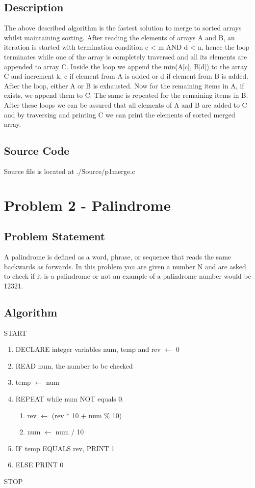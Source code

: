 \documentclass{article}
\begin{document}
\subsection{Description}
The above described algorithm is the fastest solution to merge to sorted arrays whilst maintaining sorting. After reading the elements of arrays A and B, an iteration is started with termination condition c < m AND d < n, hence the loop terminates while one of the array is completely traversed and all its elements are appended to array C. Inside the loop we append the min(A[c], B[d]) to the array C and increment k, c if element from A is added or d if element from B is added.\newline
After the loop, either A or B is exhausted. Now for the remaining items in A, if exists, we append them to C. The same is repeated for the remaining items in B.\newline
After these loops we can be assured that all elements of A and B are added to C and by traversing and printing C we can print the elements of sorted merged array.

\subsection{Source Code}
Source file is located at ./Source/p1merge.c

\newpage
\section{Problem 2 - Palindrome}
\subsection{Problem Statement}
A palindrome is defined as a word, phrase, or sequence that reads the same backwards as forwards. In this problem you are given a number N and are asked to check if it is a palindrome or not an example of a palindrome number would be 12321.
\subsection{Algorithm}
START
\begin{flushleft}
\begin{enumerate}
    \item DECLARE integer variables num, temp and rev $\leftarrow$ 0
    \item READ num, the number to be checked
    \item temp $\leftarrow$ num
    \item REPEAT while num NOT equals 0.
    \begin{enumerate}
        \item rev $\leftarrow$ (rev * 10 + num \% 10)
        \item num $\leftarrow$ num / 10
    \end{enumerate}
    \item IF temp EQUALS rev, PRINT 1
    \item ELSE PRINT 0
\end{enumerate}
\end{flushleft}
STOP
\end{document}
